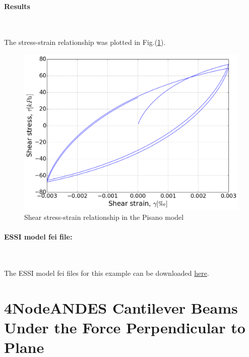 \documentclass[fleqn,11pt]{article}
\begin{document}
\newpage
\paragraph{Results} ~

The stress-strain relationship was plotted in Fig.(\ref{fig Shear stress-strain relationship in the Pisano model}). 

\begin{figure}[H]
  \centering
  \includegraphics[width=12cm]{../Figure-files/pisanoLT_test01.png}
  \caption{Shear stress-strain relationship in the Pisano model}
  \label{fig Shear stress-strain relationship in the Pisano model}
\end{figure}

\paragraph{ESSI model fei file: } ~



The ESSI model fei files for this example can be downloaded \href{https://github.com/BorisJeremic/Real-ESSI-Examples/blob/master/model_fei_file/shearbeam_pisano_plastic/shearbeam_pisano_plastic.tgz?raw=true}{here}.









\newpage
\section{4NodeANDES Cantilever Beams Under the Force Perpendicular to Plane}
\end{document}
